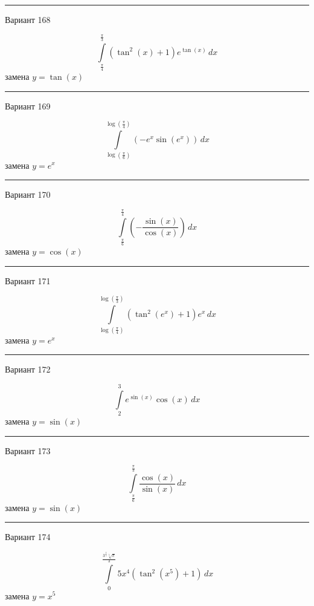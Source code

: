 \documentclass[11pt]{report}
\begin{document}
\rule{\textwidth}{.2mm}

Вариант 168

$$\int\limits_{\frac{\pi}{4}}^{\frac{\pi}{3}} \left(\tan^{2}{\left(x \right)} + 1\right) e^{\tan{\left(x \right)}}\, dx$$
замена $y = \tan{\left(x \right)}$



\rule{\textwidth}{.2mm}

Вариант 169

$$\int\limits_{\log{\left(\frac{\pi}{6} \right)}}^{\log{\left(\frac{\pi}{4} \right)}} \left(- e^{x} \sin{\left(e^{x} \right)}\right)\, dx$$
замена $y = e^{x}$



\rule{\textwidth}{.2mm}

Вариант 170

$$\int\limits_{\frac{\pi}{6}}^{\frac{\pi}{4}} \left(- \frac{\sin{\left(x \right)}}{\cos{\left(x \right)}}\right)\, dx$$
замена $y = \cos{\left(x \right)}$



\rule{\textwidth}{.2mm}

Вариант 171

$$\int\limits_{\log{\left(\frac{\pi}{4} \right)}}^{\log{\left(\frac{\pi}{3} \right)}} \left(\tan^{2}{\left(e^{x} \right)} + 1\right) e^{x}\, dx$$
замена $y = e^{x}$



\rule{\textwidth}{.2mm}

Вариант 172

$$\int\limits_{2}^{3} e^{\sin{\left(x \right)}} \cos{\left(x \right)}\, dx$$
замена $y = \sin{\left(x \right)}$



\rule{\textwidth}{.2mm}

Вариант 173

$$\int\limits_{\frac{\pi}{6}}^{\frac{\pi}{3}} \frac{\cos{\left(x \right)}}{\sin{\left(x \right)}}\, dx$$
замена $y = \sin{\left(x \right)}$



\rule{\textwidth}{.2mm}

Вариант 174

$$\int\limits_{0}^{\frac{3^{\frac{4}{5}} \sqrt[5]{\pi}}{3}} 5 x^{4} \left(\tan^{2}{\left(x^{5} \right)} + 1\right)\, dx$$
замена $y = x^{5}$
\end{document}

